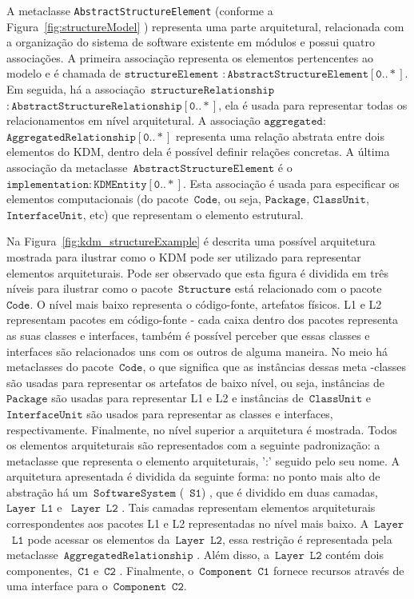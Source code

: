 A metaclasse \texttt{AbstractStructureElement} (conforme a Figura~\ref{fig:structureModel} ) representa uma parte arquitetural, relacionada com a organização do sistema de software existente em módulos e possui quatro associações. A primeira associação representa os elementos pertencentes ao modelo e é chamada de $\mathtt{structureElement}$ $\mathtt{:AbstractStructureElement[0..*]}$. Em seguida, há a associação~$\mathtt{structureRelationship}$ $\mathtt{:AbstractStructureRelationship[0..*]}$, ela é usada para representar todas os relacionamentos em nível arquitetural. A associação $\mathtt{aggregated:}$ $\mathtt{AggregatedRelationship[0..*]}$ representa uma relação abstrata entre dois elementos do KDM, dentro dela é possível definir relações concretas. A última associação da metaclasse~$\mathtt{AbstractStructureElement}$ é o~$\mathtt{implementation:KDMEntity[0..*]}$. Esta associação é usada para especificar os elementos computacionais (do pacote~$\mathtt{Code}$, ou seja, $\mathtt{Package}$, $\mathtt{ClassUnit}$, $\mathtt{InterfaceUnit}$, etc) que representam o elemento estrutural. 

Na Figura~\ref{fig:kdm_structureExample} é descrita uma possível arquitetura mostrada para ilustrar como o KDM pode ser utilizado para representar elementos arquiteturais. Pode ser observado que esta figura é dividida em três níveis para ilustrar como o pacote~$\mathtt{Structure}$ está relacionado com o pacote~$\mathtt{Code}$. O nível mais baixo representa o código-fonte, artefatos físicos. L1 e L2 representam pacotes em código-fonte - cada caixa dentro dos pacotes representa as suas classes e interfaces, também é possível perceber que essas classes e interfaces são relacionados uns com os outros de alguma maneira. No meio há metaclasses do pacote~$\mathtt{Code}$, o que significa que as instâncias dessas meta -classes são usadas para representar os artefatos de baixo nível, ou seja, instâncias de~$\mathtt{Package}$ são usadas para representar L1 e L2 e instâncias de~$\mathtt{ClassUnit}$ e~$\mathtt{InterfaceUnit}$ são usados para representar as classes e interfaces, respectivamente. Finalmente, no nível superior a arquitetura é mostrada. Todos os elementos arquiteturais são representados com a seguinte padronização: a metaclasse que representa o elemento arquiteturais, ':' seguido pelo seu nome. A arquitetura apresentada é dividida da seguinte forma: no ponto mais alto de abstração há um~$\mathtt{SoftwareSystem}$ (~$\mathtt{S1}$) , que é dividido em duas camadas, ~$\mathtt{Layer}$~$\mathtt{L1}$  e ~$\mathtt{Layer}$~$\mathtt{L2}$ . Tais camadas representam elementos arquiteturais correspondentes aos pacotes L1 e L2 representadas no nível mais baixo. A~$\mathtt{Layer}$~$\mathtt{L1}$ pode acessar os elementos da~$\mathtt{Layer}$~$\mathtt{L2}$, essa restrição  é representada pela metaclasse~$\mathtt{AggregatedRelationship}$ . Além disso, a~$\mathtt{Layer}$~$\mathtt{L2}$ contém dois componentes,~$\mathtt{C1}$  e~$\mathtt{C2}$ . Finalmente, o~$\mathtt{Component}$~$\mathtt{C1}$ fornece recursos através de uma interface para o~$\mathtt{Component}$~$\mathtt{C2}$.

